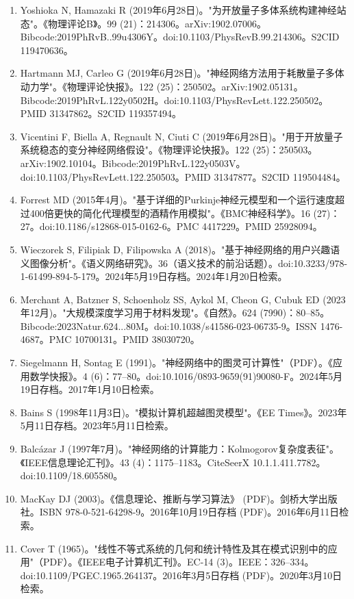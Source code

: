 \begin{enumerate}
\item Yoshioka N, Hamazaki R (2019年6月28日)。"为开放量子多体系统构建神经站态"。《物理评论B》。99 (21)：214306。arXiv:1902.07006。Bibcode:2019PhRvB..99u4306Y。doi:10.1103/PhysRevB.99.214306。S2CID 119470636。
\item Hartmann MJ, Carleo G (2019年6月28日)。"神经网络方法用于耗散量子多体动力学"。《物理评论快报》。122 (25)：250502。arXiv:1902.05131。Bibcode:2019PhRvL.122y0502H。doi:10.1103/PhysRevLett.122.250502。PMID 31347862。S2CID 119357494。
\item Vicentini F, Biella A, Regnault N, Ciuti C (2019年6月28日)。"用于开放量子系统稳态的变分神经网络假设"。《物理评论快报》。122 (25)：250503。arXiv:1902.10104。Bibcode:2019PhRvL.122y0503V。doi:10.1103/PhysRevLett.122.250503。PMID 31347877。S2CID 119504484。
\item Forrest MD (2015年4月)。"基于详细的Purkinje神经元模型和一个运行速度超过400倍更快的简化代理模型的酒精作用模拟"。《BMC神经科学》。16 (27)：27。doi:10.1186/s12868-015-0162-6。PMC 4417229。PMID 25928094。
\item Wieczorek S, Filipiak D, Filipowska A (2018)。"基于神经网络的用户兴趣语义图像分析"。《语义网络研究》。36（语义技术的前沿话题）。doi:10.3233/978-1-61499-894-5-179。2024年5月19日存档。2024年1月20日检索。
\item Merchant A, Batzner S, Schoenholz SS, Aykol M, Cheon G, Cubuk ED (2023年12月)。"大规模深度学习用于材料发现"。《自然》。624 (7990)：80–85。Bibcode:2023Natur.624...80M。doi:10.1038/s41586-023-06735-9。ISSN 1476-4687。PMC 10700131。PMID 38030720。
\item Siegelmann H, Sontag E (1991)。"神经网络中的图灵可计算性"（PDF）。《应用数学快报》。4 (6)：77–80。doi:10.1016/0893-9659(91)90080-F。2024年5月19日存档。2017年1月10日检索。
\item Bains S (1998年11月3日)。"模拟计算机超越图灵模型"。《EE Times》。2023年5月11日存档。2023年5月11日检索。
\item Balcázar J (1997年7月)。"神经网络的计算能力：Kolmogorov复杂度表征"。《IEEE信息理论汇刊》。43 (4)：1175–1183。CiteSeerX 10.1.1.411.7782。doi:10.1109/18.605580。
\item MacKay DJ (2003)。《信息理论、推断与学习算法》 (PDF)。剑桥大学出版社。ISBN 978-0-521-64298-9。2016年10月19日存档 (PDF)。2016年6月11日检索。
\item Cover T (1965)。"线性不等式系统的几何和统计特性及其在模式识别中的应用"（PDF）。《IEEE电子计算机汇刊》。EC-14 (3)。IEEE：326–334。doi:10.1109/PGEC.1965.264137。2016年3月5日存档 (PDF)。2020年3月10日检索。

\end{enumerate}
